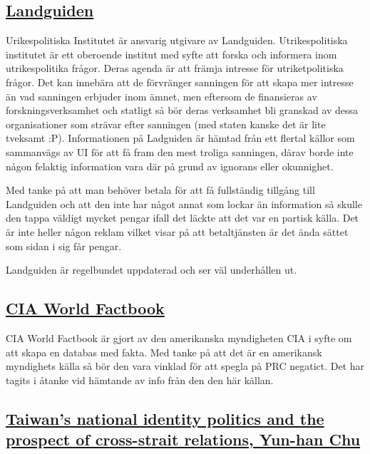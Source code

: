 \documentclass[a4paper,10pt]{article}
\begin{document}
\subsection*{\href{https://www.landguiden.se/Lander/Asien/Taiwan}{Landguiden}}
Urikespolitiska Institutet är ansvarig utgivare av Landguiden. Utrikespolitiska institutet är ett oberoende institut med syfte att forska och informera inom utrikespolitika frågor. Deras agenda är att främja intresse för utriketpolitiska frågor. Det kan innebära att de förvränger sanningen för att skapa mer intresse än vad sanningen erbjuder inom ämnet, men eftersom de finansieras av forskningsverksamhet och statligt så bör deras verksamhet bli granskad av dessa organisationer som strävar efter sanningen (med staten kanske det är lite tveksamt :P). Informationen på Ladguiden är hämtad från ett flertal källor som sammanvägs av UI för att få fram den mest troliga sanningen, därav borde inte någon felaktig information vara där på grund av ignorans eller okunnighet. 

Med tanke på att man behöver betala för att få fullständig tillgång till Landguiden och att den inte har något annat som lockar än information så skulle den tappa väldigt mycket pengar ifall det läckte att det var en partisk källa. Det är inte heller någon reklam vilket visar på att betaltjänsten är det ända sättet som sidan i sig får pengar.

Landguiden är regelbundet uppdaterad och ser väl underhållen ut.
\subsection*{\href{https://www.cia.gov/library/publications/the-world-factbook/geos/tw.html}{CIA World Factbook}}
CIA World Factbook är gjort av den amerikanska myndigheten CIA i syfte om att skapa en databas med fakta. Med tanke på att det är en amerikansk myndighets källa så bör den vara vinklad för att spegla på PRC negatict. Det har tagits i åtanke vid hämtande av info från den den här källan.

\subsection*{\href{http://isites.harvard.edu/fs/docs/icb.topic199080.files/Readings_for_October_23_/Chu.AS.04.pdf}{Taiwan’s national identity politics and the prospect of cross-strait relations, Yun-han Chu}}

%
%
%
%
%
%
%
%
%
%
%
%
%
\end{document}
